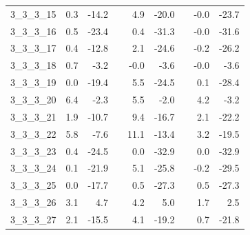 \begin{longtable}{lrrcrrcrr}
3\_3\_3\_15      &                 0.3 &                 -14.2 &&                  4.9 &                  -20.0 &&                 -0.0 &                  -23.7 \\
3\_3\_3\_16      &                 0.5 &                 -23.4 &&                  0.4 &                  -31.3 &&                 -0.0 &                  -31.6 \\
3\_3\_3\_17      &                 0.4 &                 -12.8 &&                  2.1 &                  -24.6 &&                 -0.2 &                  -26.2 \\
3\_3\_3\_18      &                 0.7 &                  -3.2 &&                 -0.0 &                   -3.6 &&                 -0.0 &                   -3.6 \\
3\_3\_3\_19      &                 0.0 &                 -19.4 &&                  5.5 &                  -24.5 &&                  0.1 &                  -28.4 \\
3\_3\_3\_20      &                 6.4 &                  -2.3 &&                  5.5 &                   -2.0 &&                  4.2 &                   -3.2 \\
3\_3\_3\_21      &                 1.9 &                 -10.7 &&                  9.4 &                  -16.7 &&                  2.1 &                  -22.2 \\
3\_3\_3\_22      &                 5.8 &                  -7.6 &&                 11.1 &                  -13.4 &&                  3.2 &                  -19.5 \\
3\_3\_3\_23      &                 0.4 &                 -24.5 &&                  0.0 &                  -32.9 &&                  0.0 &                  -32.9 \\
3\_3\_3\_24      &                 0.1 &                 -21.9 &&                  5.1 &                  -25.8 &&                 -0.2 &                  -29.5 \\
3\_3\_3\_25      &                 0.0 &                 -17.7 &&                  0.5 &                  -27.3 &&                  0.5 &                  -27.3 \\
3\_3\_3\_26      &                 3.1 &                   4.7 &&                  4.2 &                    5.0 &&                  1.7 &                    2.5 \\
3\_3\_3\_27      &                 2.1 &                 -15.5 &&                  4.1 &                  -19.2 &&                  0.7 &                  -21.8 \\

\end{longtable}
